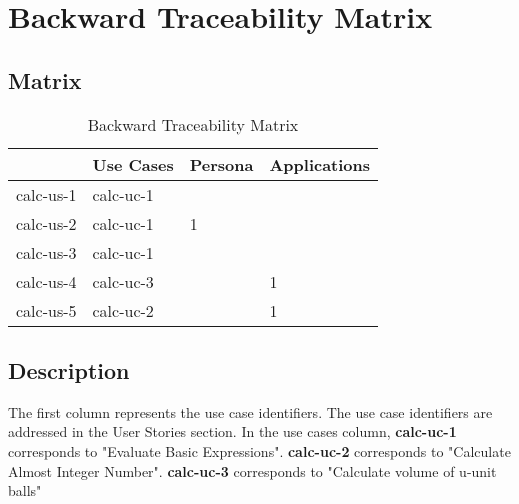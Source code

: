 \documentclass{article}
\begin{document}
\clearpage
\section{Backward Traceability Matrix}
\subsection{Matrix}
\begin{table}[h]
\centering
\begin{tabular}{|p{2cm}|p{2cm}|p{2cm}|p{2.2cm}|}
\hline
\textbf{} & \textbf{Use Cases} & \textbf{Persona} & \textbf{Applications} \\
\hline
{calc-us-1} & {calc-uc-1} & {} & {}\\
\hline
{calc-us-2} & {calc-uc-1} & {1} & {}\\
\hline
{calc-us-3} & {calc-uc-1} & {} & {}\\
\hline
{calc-us-4} & {calc-uc-3} & {} & {1}\\
\hline
{calc-us-5} & {calc-uc-2} & {} & {1}\\
\hline
\end{tabular}
\caption{Backward Traceability Matrix}
\end{table}

\subsection{Description}
\justifying
The first column represents the use case identifiers. The use case identifiers are addressed in the User Stories section.\newline \newline
In the use cases column, \textbf{calc-uc-1} corresponds to "Evaluate Basic Expressions". \textbf{calc-uc-2} corresponds to "Calculate Almost Integer Number". \textbf{calc-uc-3} corresponds to "Calculate volume of u-unit balls"
\end{document}
